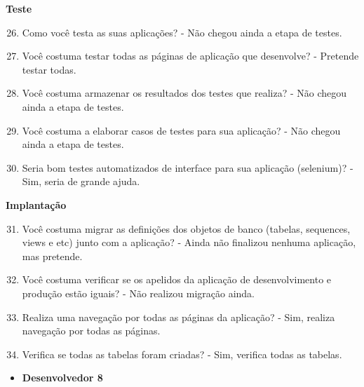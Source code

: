 \begin{anexosenv}
\textbf{Teste}

\begin{enumerate}
\setcounter{enumi}{25}
\item Como você testa as suas aplicações?\newline
- Não chegou ainda a etapa de testes.
\item Você costuma testar todas as páginas de aplicação que desenvolve?\newline
- Pretende testar todas.
\item Você costuma armazenar os resultados dos testes que realiza?\newline
- Não chegou ainda a etapa de testes.
\item Você costuma a elaborar casos de testes para sua aplicação?\newline
- Não chegou ainda a etapa de testes.
\item Seria bom testes automatizados de interface para sua aplicação (selenium)?\newline
- Sim, seria de grande ajuda.
\end{enumerate}

\textbf{Implantação}

\begin{enumerate}
\setcounter{enumi}{30}
\item Você costuma migrar as definições dos objetos de banco (tabelas, sequences, views e
etc) junto com a aplicação?\newline
- Ainda não finalizou nenhuma aplicação, mas pretende.
\item Você costuma verificar se os apelidos da aplicação de desenvolvimento e produção
estão iguais?\newline
- Não realizou migração ainda.
\item Realiza uma navegação por todas as páginas da aplicação?\newline
- Sim, realiza navegação por todas as páginas.
\item Verifica se todas as tabelas foram criadas?\newline
- Sim, verifica todas as tabelas.
\end{enumerate}



\begin{itemize}
\item \textbf{Desenvolvedor 8}
\end{itemize}


\end{anexosenv}
